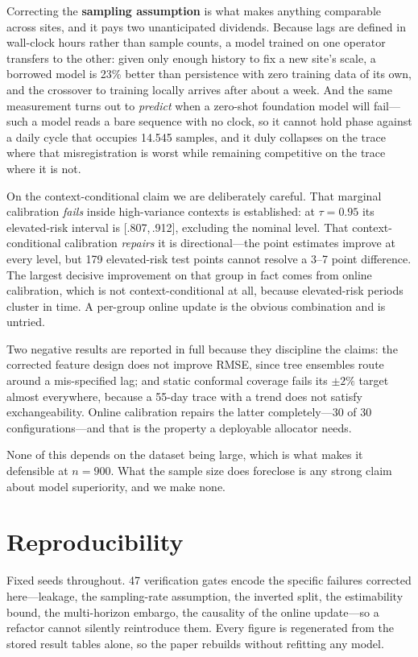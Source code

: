 \documentclass[conference]{IEEEtran}
\begin{document}
Correcting the \textbf{sampling assumption} is what makes anything comparable across
sites, and it pays two unanticipated dividends. Because lags are defined in wall-clock
hours rather than sample counts, a model trained on one operator transfers to the
other: given only enough history to fix a new site's scale, a borrowed model is 23\%
better than persistence with zero training data of its own, and the crossover to
training locally arrives after about a week. And the same measurement turns out to
\emph{predict} when a zero-shot foundation model will fail---such a model reads a bare
sequence with no clock, so it cannot hold phase against a daily cycle that occupies
14.545 samples, and it duly collapses on the trace where that misregistration is worst
while remaining competitive on the trace where it is not.

On the context-conditional claim we are deliberately careful. That marginal calibration
\emph{fails} inside high-variance contexts is established: at $\tau = 0.95$ its
elevated-risk interval is [.807,\,.912], excluding the nominal level. That
context-conditional calibration \emph{repairs} it is directional---the point estimates
improve at every level, but 179 elevated-risk test points cannot resolve a 3--7 point
difference. The largest decisive improvement on that group in fact comes from online
calibration, which is not context-conditional at all, because elevated-risk periods
cluster in time. A per-group online update is the obvious combination and is untried.

Two negative results are reported in full because they discipline the claims: the
corrected feature design does not improve RMSE, since tree ensembles route around a
mis-specified lag; and static conformal coverage fails its $\pm 2\%$ target almost
everywhere, because a 55-day trace with a trend does not satisfy exchangeability.
Online calibration repairs the latter completely---30 of 30 configurations---and that
is the property a deployable allocator needs.

None of this depends on the dataset being large, which is what makes it defensible at
$n = 900$. What the sample size does foreclose is any strong claim about model
superiority, and we make none.

\section*{Reproducibility}

Fixed seeds throughout. 47 verification gates encode the specific failures corrected
here---leakage, the sampling-rate assumption, the inverted split, the estimability
bound, the multi-horizon embargo, the causality of the online update---so a refactor
cannot silently reintroduce them. Every figure is regenerated from the stored result
tables alone, so the paper rebuilds without refitting any model.



\end{document}
